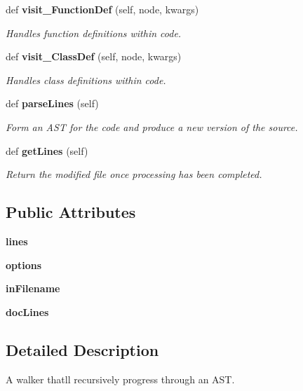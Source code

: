 \begin{DoxyCompactItemize}
def {\bf visit\+\_\+\+Function\+Def} (self, node, kwargs)
\begin{DoxyCompactList}\small\item\em Handles function definitions within code. \end{DoxyCompactList}\item 
def {\bf visit\+\_\+\+Class\+Def} (self, node, kwargs)
\begin{DoxyCompactList}\small\item\em Handles class definitions within code. \end{DoxyCompactList}\item 
def {\bf parse\+Lines} (self)
\begin{DoxyCompactList}\small\item\em Form an A\+ST for the code and produce a new version of the source. \end{DoxyCompactList}\item 
def {\bf get\+Lines} (self)
\begin{DoxyCompactList}\small\item\em Return the modified file once processing has been completed. \end{DoxyCompactList}\end{DoxyCompactItemize}
\subsection*{Public Attributes}
\begin{DoxyCompactItemize}
\item 
{\bfseries lines}\label{classdoxypypy_1_1_ast_walker_af04a38b15fc403370ddb22d109c8cbaf}

\item 
{\bfseries options}\label{classdoxypypy_1_1_ast_walker_ae6a5f43077368b3bf124485ab1096ed1}

\item 
{\bfseries in\+Filename}\label{classdoxypypy_1_1_ast_walker_a6637d78c497006d8b4032af9c8064a02}

\item 
{\bfseries doc\+Lines}\label{classdoxypypy_1_1_ast_walker_a813dc489b5ca3bca3c08bd94e0cd1489}

\end{DoxyCompactItemize}


\subsection{Detailed Description}
A walker that\textquotesingle{}ll recursively progress through an A\+ST. 

